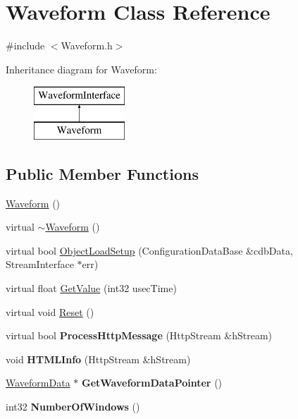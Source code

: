 \hypertarget{classWaveform}{
\section{Waveform Class Reference}
\label{classWaveform}
}


{\ttfamily \#include $<$Waveform.h$>$}

Inheritance diagram for Waveform:\begin{figure}[H]
\begin{center}
\leavevmode
\includegraphics[height=2.000000cm]{classWaveform}
\end{center}
\end{figure}
\subsection*{Public Member Functions}
\begin{DoxyCompactItemize}
\item 
\hyperlink{classWaveform_a4a10db706dde8126a190a650f0b639fb}{Waveform} ()
\item 
virtual \hyperlink{classWaveform_afe871149df16f9cd13db35327c2b18b4}{$\sim$Waveform} ()
\item 
virtual bool \hyperlink{classWaveform_a692472f16f4d52b2a1378b8f4a9ec979}{ObjectLoadSetup} (ConfigurationDataBase \&cdbData, StreamInterface $\ast$err)
\item 
virtual float \hyperlink{classWaveform_ad7063bc356998bd730c79345a97f6656}{GetValue} (int32 usecTime)
\item 
virtual void \hyperlink{classWaveform_acd7677715381b3e9edc15f25f55f8edb}{Reset} ()
\item 
\hypertarget{classWaveform_a5f8c1672244a62bd673e752e7a741222}{
virtual bool {\bfseries ProcessHttpMessage} (HttpStream \&hStream)}
\label{classWaveform_a5f8c1672244a62bd673e752e7a741222}

\item 
\hypertarget{classWaveform_a53510c056e86f9d93f95edcb13b3e816}{
void {\bfseries HTMLInfo} (HttpStream \&hStream)}
\label{classWaveform_a53510c056e86f9d93f95edcb13b3e816}

\item 
\hypertarget{classWaveform_a740fbd30b18492210592b685cfbb31de}{
\hyperlink{structWaveformData}{WaveformData} $\ast$ {\bfseries GetWaveformDataPointer} ()}
\label{classWaveform_a740fbd30b18492210592b685cfbb31de}

\item 
\hypertarget{classWaveform_a3fd5e0286b2234cc73cdce919bc286dd}{
int32 {\bfseries NumberOfWindows} ()}
\label{classWaveform_a3fd5e0286b2234cc73cdce919bc286dd}

\end{DoxyCompactItemize}


